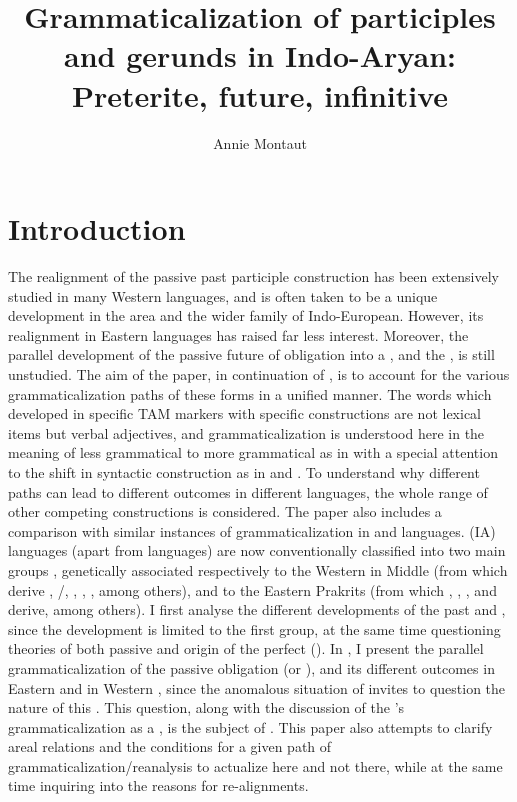 \documentclass[output=paper]{langsci/langscibook}
\title{Grammaticalization of participles and gerunds in Indo-Aryan: Preterite, future, infinitive}
\author{%
 Annie Montaut\affiliation{Inalco (Paris)}
}
\begin{document}
 
 

\section{Introduction}\label{sec:montaut:1}

The  realignment of the  passive past participle construction has been extensively studied in many Western  languages, and is often taken to be a unique development in the area and the wider family of Indo-European. However, its  realignment in Eastern languages has raised far less interest. Moreover, the parallel development of the passive future  of obligation into a , and the , is still unstudied. The aim of the paper, in continuation of \citet{MontautInPress}, is to account for the various grammaticalization paths of these forms in a unified manner. The words which developed in specific TAM markers with specific constructions are not lexical items but verbal adjectives, and grammaticalization is understood here in the meaning of less grammatical to more grammatical as in \citet{Hopper2003} with a special attention to the shift in syntactic construction as in \citet{Benveniste1966[1952]} and \citet{Kuryłowicz1965}. To understand why different paths can lead to different outcomes in different languages, the whole range of other competing constructions is considered. The paper also includes a comparison with similar instances of grammaticalization in  and  languages.
 (IA) languages (apart from  languages) are now conventionally classified into two main groups \citep{Cardona2003}, genetically associated respectively to the Western  in Middle  (from which derive , /, , , , among others), and to the Eastern  Prakrits (from which , , , and  derive, among others). I first analyse the different developments of the past  and , since the  development is limited to the first group, at the same time questioning theories of both passive and  origin of the perfect (). In , I present the parallel grammaticalization of the passive obligation  (or ), and its different outcomes in Eastern and in Western , since the anomalous situation of  invites to question the nature of this . This question, along with the discussion of the ’s grammaticalization as a , is the subject of . 
This paper also attempts to clarify areal relations and the conditions for a given path of grammaticalization/reanalysis to actualize here and not there, while at the same time inquiring into the reasons for re-alignments.
\end{document}
